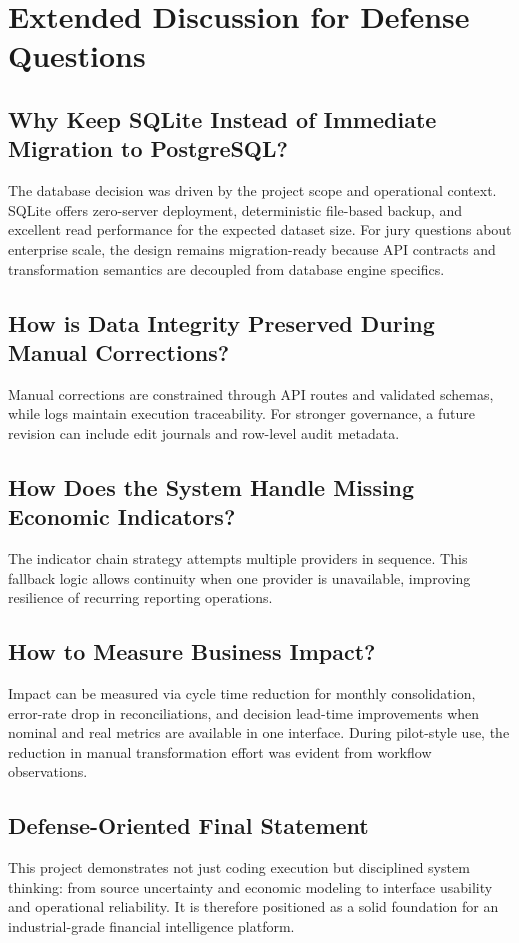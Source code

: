 \documentclass[12pt,a4paper]{report}
\begin{document}
\chapter{Extended Discussion for Defense Questions}
\section{Why Keep SQLite Instead of Immediate Migration to PostgreSQL?}
The database decision was driven by the project scope and operational context. SQLite offers zero-server deployment, deterministic file-based backup, and excellent read performance for the expected dataset size. For jury questions about enterprise scale, the design remains migration-ready because API contracts and transformation semantics are decoupled from database engine specifics.

\section{How is Data Integrity Preserved During Manual Corrections?}
Manual corrections are constrained through API routes and validated schemas, while logs maintain execution traceability. For stronger governance, a future revision can include edit journals and row-level audit metadata.

\section{How Does the System Handle Missing Economic Indicators?}
The indicator chain strategy attempts multiple providers in sequence. This fallback logic allows continuity when one provider is unavailable, improving resilience of recurring reporting operations.

\section{How to Measure Business Impact?}
Impact can be measured via cycle time reduction for monthly consolidation, error-rate drop in reconciliations, and decision lead-time improvements when nominal and real metrics are available in one interface. During pilot-style use, the reduction in manual transformation effort was evident from workflow observations.

\section{Defense-Oriented Final Statement}
This project demonstrates not just coding execution but disciplined system thinking: from source uncertainty and economic modeling to interface usability and operational reliability. It is therefore positioned as a solid foundation for an industrial-grade financial intelligence platform.

\clearpage


\end{document}
